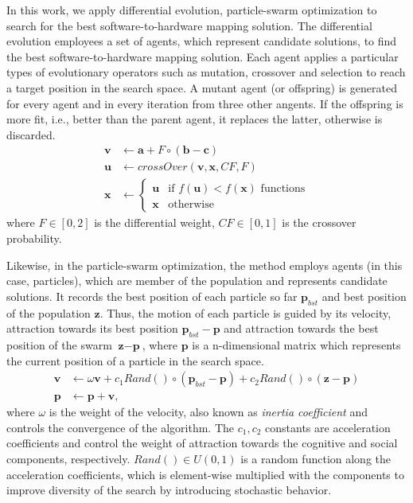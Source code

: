 In this work, we apply differential evolution, particle-swarm optimization to search for the best software-to-hardware mapping solution. The differential evolution employees a set of agents, which represent candidate solutions,  to find the best software-to-hardware mapping solution. Each agent applies a particular types of evolutionary operators such as mutation, crossover and selection to reach a target position in the search space. A mutant agent (or offspring) is generated for every agent and in every iteration from three other angents. If the offspring is more fit, i.e., better than the parent agent, it replaces the latter, otherwise is discarded.
\begin{align}
\label{eqn_de_mutation}
\textbf{v} & \leftarrow   \textbf{a} + F\circ(\textbf{b}-\textbf{c})\\
\label{eqn_de_crossover}
\textbf{u}&\leftarrow crossOver(\textbf{v},\textbf{x},CF,F)\\
\label{eqn_de_selection}
\textbf{x} &\leftarrow 
\begin{cases}
	\textbf{u} & \mbox{if } f(\textbf{u}) < f(\textbf{x})\mbox{ functions}\\
	\textbf{x} & \mbox{otherwise }
\end{cases}
\end{align}
where $F\in[0,2]$ is the differential weight, $CF\in[0,1]$ is the crossover probability.

Likewise, in the particle-swarm optimization, the method employs agents (in this case, particles), which are member of the population and represents candidate solutions. It records the best position of each particle so far $\textbf{p}_{bst}$ and best position of the population $\textbf{z}$. Thus, the motion of each particle is guided by its velocity, attraction towards its best position $\textbf{p}_{bst}-\textbf{p}$ and attraction towards the best position of the swarm $\textbf{z}-\textbf{p}$, where $\textbf{p}$ is a n-dimensional matrix which represents the current position of a particle in the search space.
\begin{align}
\label{eqn_pso_velocity}
\textbf{v} &\leftarrow  \omega\textbf{v} + c_1Rand()\circ(\textbf{p}_{bst}-\textbf{p}) + c_2Rand()\circ(\textbf{z}-\textbf{p})\\
\label{eqn_pso_position}
\textbf{p} &\leftarrow \textbf{p} + \textbf{v},
\end{align}
where $\omega$ is the weight of the velocity, also known as \textit{inertia coefficient} and controls the convergence of the algorithm. The $c_1, c_2$ constants are acceleration coefficients and control the weight of attraction towards the cognitive and social components, respectively. $Rand()\in U(0,1)$ is a random function along the acceleration coefficients, which is element-wise multiplied with the components to improve diversity of the search by introducing stochastic behavior.